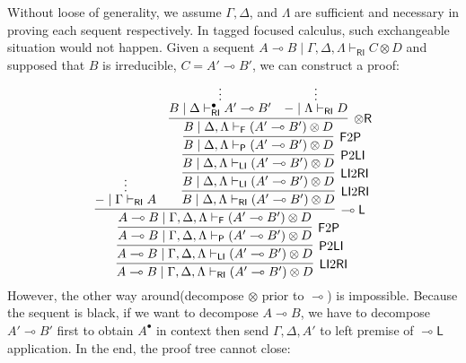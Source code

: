 \documentclass[submission,copyright,creativecommons]{eptcs}
\newcommand{\tr}{\otimes \mathsf{R}}
\newcommand{\lleft}{\multimap \mathsf{L}}
\newcommand{\ot}{\otimes}
\newcommand{\lolli}{\multimap}
\newcommand{\RI}{\mathsf{RI}}
\newcommand{\LI}{\mathsf{LI}}
\newcommand{\Pass}{\mathsf{P}}
\newcommand{\F}{\mathsf{F}}
\begin{document}
Without loose of generality, we assume $\Gamma, \Delta$, and $\Lambda$ are sufficient and necessary in proving each sequent respectively.
In tagged focused calculus, such exchangeable situation would not happen.
Given a sequent $A \lolli B \mid \Gamma , \Delta , \Lambda \vdash_{\RI} C \ot D$ and supposed that $B$ is irreducible, $C = A' \lolli B'$,
we can construct a proof:
\begin{displaymath}
  \infer[\LI 2 \RI]{A \lolli B \mid \Gamma , \Delta , \Lambda \vdash_{\RI} (A' \lolli B') \ot D}{
    \infer[\Pass 2 \LI]{A \lolli B \mid \Gamma , \Delta , \Lambda \vdash_{\LI} (A' \lolli B') \ot D}{
      \infer[\F 2 \Pass]{A \lolli B \mid \Gamma , \Delta , \Lambda \vdash_{\Pass} (A' \lolli B') \ot D}{
        \infer[\lleft]{A \lolli B \mid \Gamma , \Delta , \Lambda \vdash_{\F} (A' \lolli B') \ot D}{
          \deduce{- \mid \Gamma \vdash_{\RI} A }{\vdots}
          &
          \infer[\LI 2 \RI]{B \mid \Delta , \Lambda \vdash_{\RI} (A' \lolli B') \ot D}{
            \infer[\LI 2 \RI]{B \mid \Delta , \Lambda \vdash_{\LI} (A' \lolli B') \ot D}{
              \infer[\Pass 2 \LI]{B \mid \Delta , \Lambda \vdash_{\LI} (A' \lolli B') \ot D}{
                \infer[\F 2 \Pass]{B \mid \Delta , \Lambda \vdash_{\Pass} (A' \lolli B') \ot D}{
                  \infer[\tr]{B \mid \Delta , \Lambda \vdash_{\F} (A' \lolli B') \ot D}{
                    \deduce{B \mid \Delta \vdash^{\bullet}_{\RI} A' \lolli B'}{\vdots}
                    &
                    \deduce{- \mid \Lambda \vdash_{\RI} D}{\vdots}
                  }
                }
              }
            }
          }
        }
      }
    }
  }
\end{displaymath}
However, the other way around(decompose $\ot$ prior to $\lolli$) is impossible.
Because the sequent is black, if we want to decompose $A \lolli B$, we have to decompose $A' \lolli B'$ first to obtain $A^{\bullet}$ in context then send $\Gamma , \Delta , A'$ to left premise of $\lleft$ application.
In the end, the proof tree cannot close:
\end{document}
